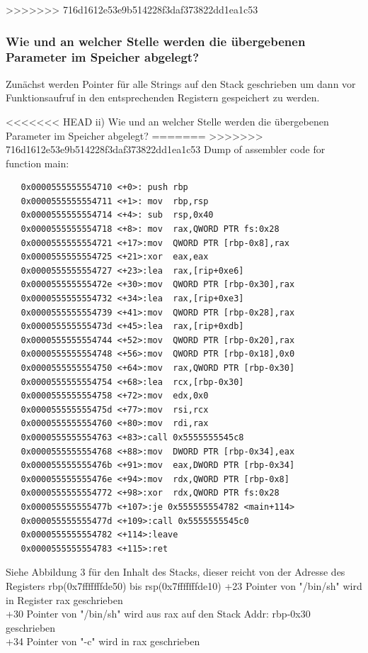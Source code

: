 \documentclass[12pt]{article}
\begin{document}
>>>>>>> 716d1612e53e9b514228f3daf373822dd1ea1c53


\subsubsection{Wie und an welcher Stelle werden die übergebenen Parameter im Speicher abgelegt?}

Zunächst werden Pointer für alle Strings auf den Stack geschrieben um dann vor Funktionsaufruf in den entsprechenden Registern gespeichert zu werden.

<<<<<<< HEAD
ii) Wie und an welcher Stelle werden die \"ubergebenen Parameter im Speicher abgelegt?
=======
>>>>>>> 716d1612e53e9b514228f3daf373822dd1ea1c53
Dump of assembler code for function main:
\begin{lstlisting}
   0x0000555555554710 <+0>:	push rbp
   0x0000555555554711 <+1>:	mov  rbp,rsp
   0x0000555555554714 <+4>:	sub  rsp,0x40
   0x0000555555554718 <+8>:	mov  rax,QWORD PTR fs:0x28
   0x0000555555554721 <+17>:mov  QWORD PTR [rbp-0x8],rax
   0x0000555555554725 <+21>:xor  eax,eax
   0x0000555555554727 <+23>:lea  rax,[rip+0xe6]
   0x000055555555472e <+30>:mov  QWORD PTR [rbp-0x30],rax
   0x0000555555554732 <+34>:lea  rax,[rip+0xe3]
   0x0000555555554739 <+41>:mov  QWORD PTR [rbp-0x28],rax
   0x000055555555473d <+45>:lea  rax,[rip+0xdb]
   0x0000555555554744 <+52>:mov  QWORD PTR [rbp-0x20],rax
   0x0000555555554748 <+56>:mov  QWORD PTR [rbp-0x18],0x0
   0x0000555555554750 <+64>:mov  rax,QWORD PTR [rbp-0x30]
   0x0000555555554754 <+68>:lea  rcx,[rbp-0x30]
   0x0000555555554758 <+72>:mov  edx,0x0
   0x000055555555475d <+77>:mov  rsi,rcx
   0x0000555555554760 <+80>:mov  rdi,rax
   0x0000555555554763 <+83>:call 0x5555555545c8
   0x0000555555554768 <+88>:mov  DWORD PTR [rbp-0x34],eax
   0x000055555555476b <+91>:mov  eax,DWORD PTR [rbp-0x34]
   0x000055555555476e <+94>:mov  rdx,QWORD PTR [rbp-0x8]
   0x0000555555554772 <+98>:xor  rdx,QWORD PTR fs:0x28
   0x000055555555477b <+107>:je 0x555555554782 <main+114>
   0x000055555555477d <+109>:call 0x5555555545c0
   0x0000555555554782 <+114>:leave  
   0x0000555555554783 <+115>:ret  
\end{lstlisting}
\newpage
Siehe Abbildung 3 für den Inhalt des Stacks, dieser reicht von der Adresse des Registers rbp(0x7fffffffde50) bis rsp(0x7fffffffde10)
+23 Pointer von "/bin/sh" wird in Register rax geschrieben \\
+30 Pointer von "/bin/sh" wird aus rax auf den Stack Addr: rbp-0x30 geschrieben\\
+34 Pointer von "-c" wird in rax geschrieben\\
\end{document}
